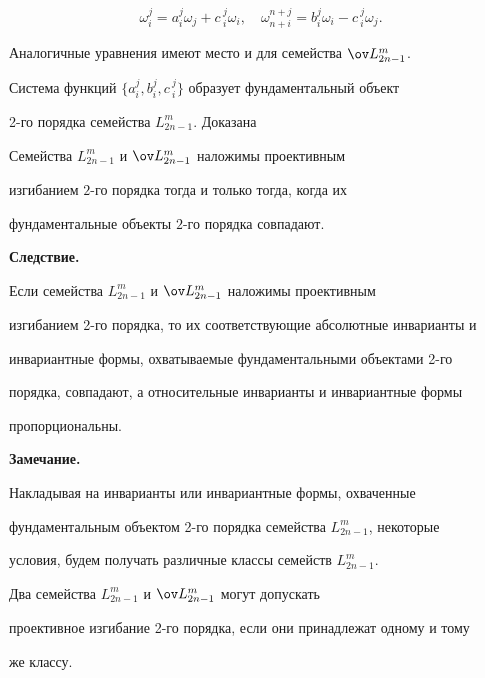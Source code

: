 $$ 


\omega^j_i=a^j_i\omega_j+c\,^j_i\omega_i,\quad 


\omega^{n+j}_{n+i}=b^j_i\omega_i-c\,^j_i\omega_j. 


$$ 


Аналогичные уравнения имеют место и для семейства $\ov L^m_{2n-1}$. 


Система функций $\{a^j_i,b^j_i,c\,^j_i\}$ образует фундаментальный объект 


2-го порядка семейства $L^m_{2n-1}$. Доказана 


 


\begin{thm} 


Семейства $L^m_{2n-1}$ и $\ov L^m_{2n-1}$ наложимы проективным 


изгибанием $2$-го порядка тогда и только тогда, когда их 


фундаментальные объекты $2$-го порядка совпадают. 


\end{thm} 


 


{\bf Следствие.} 


Если семейства $L^m_{2n-1}$ и $\ov L^m_{2n-1}$ наложимы проективным 


изгибанием 2-го порядка, то их соответствующие абсолютные инварианты и 


инвариантные формы, охватываемые фундаментальными объектами 2-го 


порядка, совпадают, а относительные инварианты и инвариантные формы 


пропорциональны. 


\medskip





{\bf Замечание.}


Накладывая на инварианты или инвариантные формы, охваченные 


фундаментальным объектом 2-го порядка семейства $L^m_{2n-1}$, некоторые 


условия, будем получать различные классы семейств $L^m_{2n-1}$. 


Два семейства $L^m_{2n-1}$ и $\ov L^m_{2n-1}$ могут допускать 


проективное изгибание 2-го порядка, если они принадлежат одному и тому 


же классу. 


